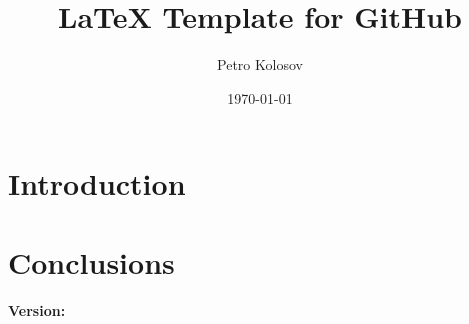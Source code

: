 \documentclass[12pt,letterpaper,oneside,reqno]{amsart}
\title[LaTeX Template for GitHub]
{LaTeX Template for GitHub}
\author[Petro Kolosov]{Petro Kolosov}
\date{\today}
\numberwithin{equation}{section}
\begin{document}
    \maketitle

    \begin{abstract}
        
    \end{abstract}

    \tableofcontents



    \section{Introduction} \label{sec:introduction}
    


    \section{Conclusions}\label{sec:conclusions}
    

    
    
    \noindent \textbf{Version:} 
\end{document}
